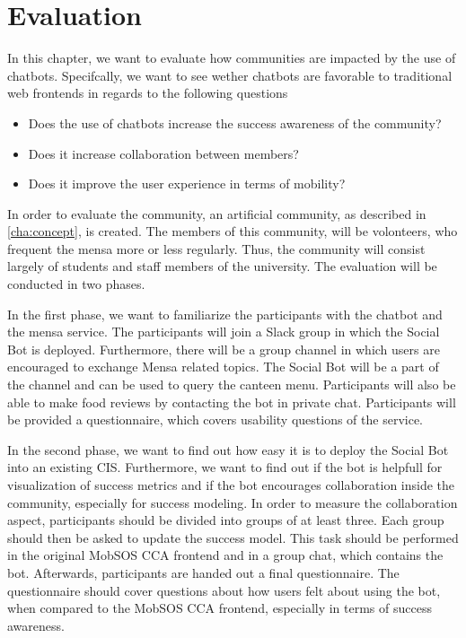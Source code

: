 \chapter{Evaluation}\label{cha:eval}
In this chapter, we want to evaluate how communities are impacted by the use of chatbots.
Specifcally, we want to see wether chatbots are favorable to traditional web frontends in regards to the following questions
\begin{itemize}
    \item Does the use of chatbots increase the success awareness of the community?
    \item Does it increase collaboration between members?
    \item Does it improve the user experience in terms of mobility?
\end{itemize}

In order to evaluate the community, an artificial community, as described in \ref{cha:concept}, is created.
The members of this community, will be volonteers, who frequent the mensa more or less regularly.
Thus, the community will consist largely of students and staff members of the university.
The evaluation will be conducted in two phases.

In the first phase, we want to familiarize the participants with the chatbot and the mensa service.
The participants will join a Slack group in which the Social Bot is deployed.
Furthermore, there will be a group channel in which users are encouraged to exchange Mensa related topics. The Social Bot will be a part of the channel and can be used to query the canteen menu.
Participants will also be able to make food reviews by contacting the bot in private chat.
Participants will be provided a questionnaire, which covers usability questions of the service.

In the second phase, we want to find out how easy it is to deploy the Social Bot into an existing CIS.
Furthermore, we want to find out if the bot is helpfull for visualization of success metrics and if the bot encourages collaboration inside the community, especially for success modeling.
In order to measure the collaboration aspect, participants should be divided into groups of at least three.
Each group should then be asked to update the success model.
This task should be performed in the original MobSOS CCA frontend and in a group chat, which contains the bot.
Afterwards, participants are handed out a final questionnaire.
The questionnaire should cover questions about how users felt about using the bot, when compared to the MobSOS CCA frontend, especially in terms of success awareness.


